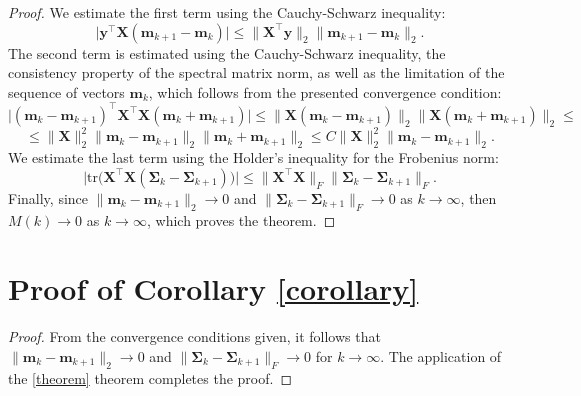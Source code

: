 \documentclass[runningheads]{llncs}
\begin{document}
\begin{proof}
We estimate the first term using the Cauchy-Schwarz inequality:
\[\big| \mathbf{y}^{\top}\mathbf{X}(\mathbf{m}_{k+1}-\mathbf{m}_k)\big| \leqslant \| \mathbf{X}^{\top}\mathbf{y} \|_2 \|\mathbf{m}_{k+1} - \mathbf{m}_k\|_2. \]
    The second term is estimated using the Cauchy-Schwarz inequality, the consistency property of the spectral matrix norm, as well as the limitation of the sequence of vectors $\mathbf{m}_k$, which follows from the presented convergence condition:
\[\big| (\mathbf{m}_k - \mathbf{m}_{k+1})^{\top} \mathbf{X}^{\top}\mathbf{X} (\mathbf{m}_k + \mathbf{m}_{k+1}) \big| \leqslant \| \mathbf{X} (\mathbf{m}_k - \mathbf{m}_{k+1}) \|_2 \| \mathbf{X} (\mathbf{m}_k + \mathbf{m}_{k+1}) \|_2 \leqslant \]
    \[ \leqslant \| \mathbf{X} \|_2^2 \| \mathbf{m}_k - \mathbf{m}_{k+1} \|_2 \| \mathbf{m}_k + \mathbf{m}_{k+1} \|_2 \leqslant C \| \mathbf{X} \|_2^2 \| \mathbf{m}_k - \mathbf{m}_{k+1} \|_2. \]
    We estimate the last term using the Holder's inequality for the Frobenius norm:
    \[ \Big| \text{tr} \Big( \mathbf{X}^{\top}\mathbf{X} \left( \mathbf{\Sigma}_k - \mathbf{\Sigma}_{k+1} \right) \Big) \Big| \leqslant \| \mathbf{X}^{\top}\mathbf{X} \|_F \| \mathbf{\Sigma}_k - \mathbf{\Sigma}_{k+1} \|_F. \]
Finally, since $\|\mathbf{m}_k - \mathbf{m}_{k+1} \|_2\to 0$ and $\|\mathbf{\Sigma}_k - \mathbf{\Sigma}_{k+1}\|_{F}\to 0$ as $k\to\infty$, then $M(k)\to 0$ as $k\to \infty$, which proves the theorem.
\end{proof}

\section{Proof of Corollary \ref{corollary}}

\begin{proof}
    From the convergence conditions given, it follows that $\|\mathbf{m}_k - \mathbf{m}_{k+1} \|_2\to 0$ and $\|\mathbf{\Sigma}_k -\mathbf{\Sigma}_{k+1}\|_{F}\to 0$ for $k\to \infty$. The application of the \ref{theorem} theorem completes the proof.
\end{proof}
\end{document}
